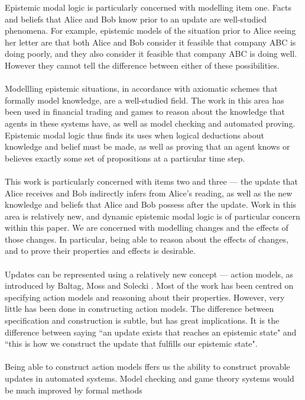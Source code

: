 Epistemic modal logic is particularly concerned with modelling item one.
Facts and beliefs that Alice and Bob know prior to an update are well-studied phenomena.
For example, epistemic models of the situation prior to Alice seeing her letter are that both Alice
and Bob consider it feasible that company ABC is doing poorly, and they also consider it feasible
that company ABC is doing well.
However they cannot tell the difference between either of these possibilities.\\
\\
Modellling epistemic situations, in accordance with axiomatic schemes that
formally model knowledge, are a well-studied field.
The work in this area has been used in financial trading and games to reason about the knowledge
that agents in these systems have, as well as model checking and automated proving.
Epistemic modal logic thus finds its uses when logical deductions about knowledge and belief must be
made, as well as proving that an agent knows or believes exactly some set of propositions at a
particular time step.\\
\\
This work is particularly concerned with items two and  three --- the update that Alice receives and Bob
indirectly infers from Alice's reading, as well as the new knowledge and beliefs that Alice and Bob
possess after the update.
Work in this area is relatively new, and dynamic epistemic modal logic is of particular concern
within this paper.
We are concerned with modelling changes and the effects of those changes.
In particular, being able to reason about the effects of changes, and to prove their properties and
effects is desirable.\\
\\
Updates can be represented using a relatively new concept --- action models, as
introduced by Baltag, Moss and Solecki \cite{baltag1998lpa}.
Most of the work has been centred on specifying action models and reasoning
about their properties.
However, very little has been done in constructing action models.
The difference between specification and construction is subtle, but has great
implications.
It is the difference between saying ``an update exists that reaches an epistemic
state" and ``this
is how we construct the update that fulfills our epistemic state".\\
\\
Being able to construct action models ffers us the ability to construct provable 
updates in automated systems.
Model checking and game theory systems would be much improved by formal methods
